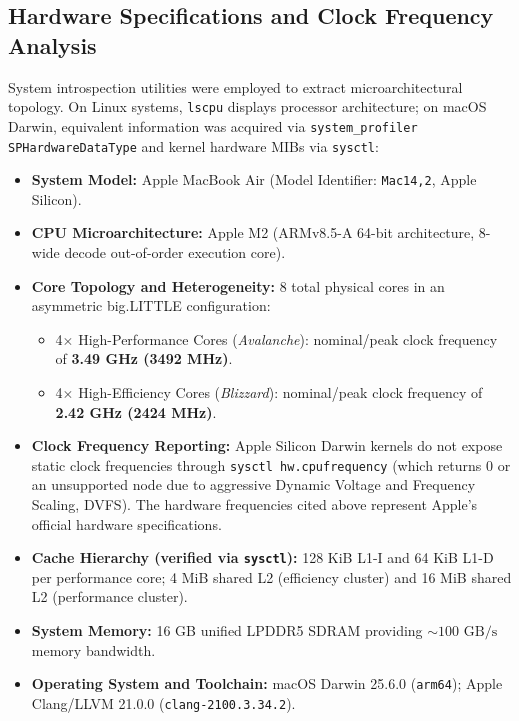 \documentclass[11pt,a4paper]{article}
\begin{document}
\subsection{Hardware Specifications and Clock Frequency Analysis}
System introspection utilities were employed to extract microarchitectural topology. On Linux systems, \texttt{lscpu} displays processor architecture; on macOS Darwin, equivalent information was acquired via \texttt{system\_profiler SPHardwareDataType} and kernel hardware MIBs via \texttt{sysctl}:
\begin{itemize}[leftmargin=1.4em]
    \item \textbf{System Model:} Apple MacBook Air (Model Identifier: \texttt{Mac14,2}, Apple Silicon).
    \item \textbf{CPU Microarchitecture:} Apple M2 (ARMv8.5-A 64-bit architecture, 8-wide decode out-of-order execution core).
    \item \textbf{Core Topology and Heterogeneity:} 8 total physical cores in an asymmetric big.LITTLE configuration:
    \begin{itemize}
        \item 4$\times$ High-Performance Cores (\textit{Avalanche}): nominal/peak clock frequency of \textbf{3.49 GHz (3492 MHz)}.
        \item 4$\times$ High-Efficiency Cores (\textit{Blizzard}): nominal/peak clock frequency of \textbf{2.42 GHz (2424 MHz)}.
    \end{itemize}
    \item \textbf{Clock Frequency Reporting:} Apple Silicon Darwin kernels do not expose static clock frequencies through \texttt{sysctl hw.cpufrequency} (which returns 0 or an unsupported node due to aggressive Dynamic Voltage and Frequency Scaling, DVFS). The hardware frequencies cited above represent Apple's official hardware specifications.
    \item \textbf{Cache Hierarchy (verified via \texttt{sysctl}):} 128 KiB L1-I and 64 KiB L1-D per performance core; 4 MiB shared L2 (efficiency cluster) and 16 MiB shared L2 (performance cluster).
    \item \textbf{System Memory:} 16 GB unified LPDDR5 SDRAM providing ${\sim}100\text{ GB/s}$ memory bandwidth.
    \item \textbf{Operating System and Toolchain:} macOS Darwin 25.6.0 (\texttt{arm64}); Apple Clang/LLVM 21.0.0 (\texttt{clang-2100.3.34.2}).
\end{itemize}
\end{document}
